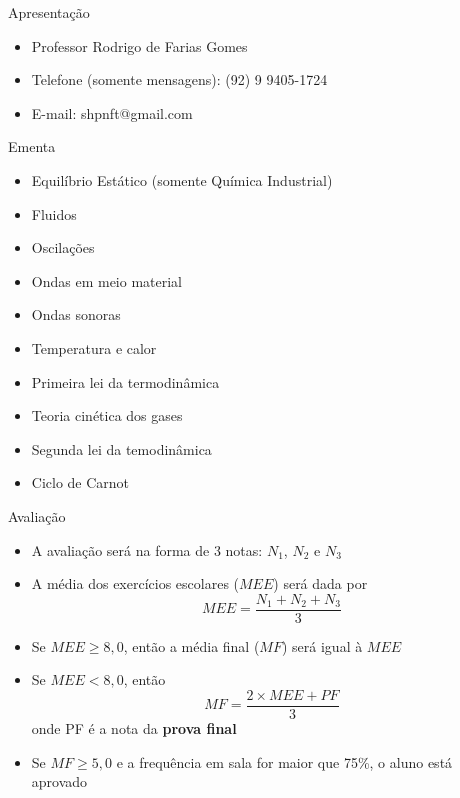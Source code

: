 \begin{frame}%
    \titlepage
\end{frame}

\begin{frame}[c]{Apresentação}
    \begin{itemize}
        \item Professor Rodrigo de Farias Gomes
        \item Telefone (somente mensagens): (92) 9 9405-1724
        \item E-mail: shpnft@gmail.com
    \end{itemize}
\end{frame}

\begin{frame}{Ementa}
    \begin{itemize}
        \item Equilíbrio Estático (somente Química Industrial)
        \item Fluidos
        \item Oscilações
        \item Ondas em meio material
        \item Ondas sonoras
        \item Temperatura e calor
        \item Primeira lei da termodinâmica
        \item Teoria cinética dos gases
        \item Segunda lei da temodinâmica
        \item Ciclo de Carnot
    \end{itemize}
\end{frame}

\begin{frame}{Avaliação}
    \begin{itemize}
        \item A avaliação será na forma de 3 notas: \(N_1\), \(N_2\) e \(N_3\)
        \item A média dos exercícios escolares (\(MEE\)) será dada por
            \[
                MEE=\frac{N_1+N_2+N_3}{3}
            \]
        \item Se \(MEE \geq 8,0\), então a média final (\(MF\)) será igual à \(MEE\)
        \item Se \(MEE < 8,0\), então
            \[
                MF=\frac{2\times MEE+PF}{3}
            \]
            onde PF é a nota da \textbf{prova final}
        \item Se \(MF \geq 5,0\) e a frequência em sala for maior que 75\%, o aluno está aprovado
    \end{itemize}
\end{frame}

